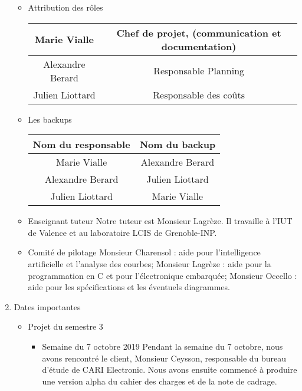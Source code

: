 \documentclass[11pt]{report}
\begin{document}
\begin{enumerate}
\begin{itemize}
    	    \item Attribution des rôles
        	    \newline
        	    \newline
    	        \begin{tabular}{|c|c|}
    	            \hline
    	             Marie Vialle & Chef de projet, (communication et documentation) \\
    	             \hline
    	             Alexandre Berard & Responsable Planning \\
    	             \hline
    	             Julien Liottard & Responsable des coûts \\
    	             \hline
    	        \end{tabular}
    	        \newline
\newpage     	        
    \item Les backups
	    \newline 
	    \newline
	    \begin{tabular}{|c|c|}
            \hline
             Nom du responsable & Nom du backup \\
            \hline
             Marie Vialle & Alexandre Berard \\
             \hline
             Alexandre Berard & Julien Liottard \\
             \hline
             Julien Liottard & Marie Vialle \\
             \hline
        \end{tabular}
        \newline
    
    \item Enseignant tuteur
    \newline Notre tuteur est Monsieur Lagrèze. Il travaille à l'IUT de Valence et au laboratoire LCIS de Grenoble-INP.
    
    \item Comité de pilotage
        \newline Monsieur Charensol : aide pour l'intelligence artificielle et l'analyse des courbes;
        \newline Monsieur Lagrèze : aide pour la programmation en C et pour l'électronique embarquée;
        \newline Monsieur Occello : aide pour les spécifications et les éventuels diagrammes.

    	\end{itemize}
	\item \LARGE Dates importantes
    	\begin{itemize}  \large
    	    \item Projet du semestre 3
    	    \begin{itemize} 
    	        \item Semaine du 7 octobre 2019
    	            \newline Pendant la semaine du 7 octobre, nous avons rencontré le client, Monsieur Ceysson, responsable du bureau d'étude de CARI Electronic. Nous avons ensuite commencé à produire une version alpha du cahier des charges et de la note de cadrage. 
    	            

\end{itemize}
\end{itemize}
\end{enumerate}
\end{document}
